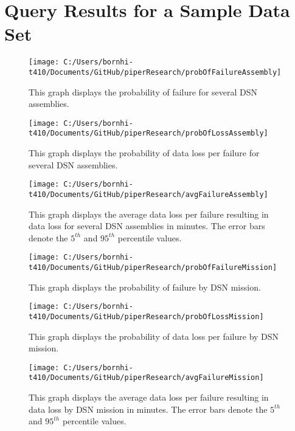 \documentclass[aps,twocolumn,nobalancelastpage,amsmath,amssymb,
nofootinbib,superscriptaddress, ]{revtex4}
\begin{document}
\clearpage
\appendix

\section{Query Results for a Sample Data Set}

\begin{figure}[h]
\texttt{[image: C:/Users/bornhi-t410/Documents/GitHub/piperResearch/probOfFailureAssembly]}
\caption{This graph displays the probability of failure for several DSN assemblies.\label{fig:fig2}}
\end{figure}

\begin{figure}[h]
\texttt{[image: C:/Users/bornhi-t410/Documents/GitHub/piperResearch/probOfLossAssembly]}
\caption{This graph displays the probability of data loss per failure for several DSN assemblies.\label{fig:fig3}}
\end{figure}

\begin{figure}[h]
\texttt{[image: C:/Users/bornhi-t410/Documents/GitHub/piperResearch/avgFailureAssembly]}
\caption{This graph displays the average data loss per failure resulting in data loss for several DSN assemblies in minutes. The error bars denote the $5^{th}$ and $95^{th}$ percentile values. \label{fig:fig4}}
\end{figure}

\begin{figure}[h]
\texttt{[image: C:/Users/bornhi-t410/Documents/GitHub/piperResearch/probOfFailureMission]}
\caption{This graph displays the probability of failure by DSN mission.\label{fig:fig5}}
\end{figure}

\begin{figure}[h]
\texttt{[image: C:/Users/bornhi-t410/Documents/GitHub/piperResearch/probOfLossMission]}
\caption{This graph displays the probability of data loss per failure by DSN mission.\label{fig:fig6}}
\end{figure}

\begin{figure}[h]
\texttt{[image: C:/Users/bornhi-t410/Documents/GitHub/piperResearch/avgFailureMission]}
\caption{This graph displays the average data loss per failure resulting in data loss by DSN mission in minutes. The error bars denote the $5^{th}$ and $95^{th}$ percentile values. \label{fig:fig7}}
\end{figure}
\end{document}
